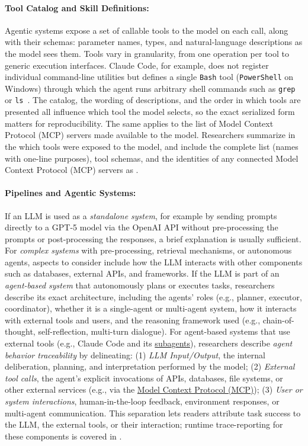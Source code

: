 \paragraph{Tool Catalog and Skill Definitions:}
Agentic systems expose a set of callable tools to the model on each call, along with their schemas: parameter names, types, and natural-language descriptions as the model sees them.
Tools vary in granularity, from one operation per tool to generic execution interfaces.
Claude Code, for example, does not register individual command-line utilities but defines a single \texttt{Bash} tool (\texttt{PowerShell} on Windows) through which the agent runs arbitrary shell commands such as \texttt{grep} or \texttt{ls}~\cite{anthropic_tools_reference}.
The catalog, the wording of descriptions, and the order in which tools are presented all influence which tool the model selects, so the exact serialized form matters for reproducibility.
The same applies to the list of Model Context Protocol (MCP) servers made available to the model.
Researchers \must summarize in the \paper which tools were exposed to the model, and \should include the complete list (names with one-line purposes), tool schemas, and the identities of any connected Model Context Protocol (MCP) servers as \supplementarymaterial. 

\paragraph{Pipelines and Agentic Systems:}
If an LLM is used as a \emph{standalone system}, for example by sending prompts directly to a GPT-5 model via the OpenAI API without pre-processing the prompts or post-processing the responses, a brief explanation is usually sufficient.
For \emph{complex systems} with pre-processing, retrieval mechanisms, or autonomous agents, aspects to consider include how the LLM interacts with other components such as databases, external APIs, and frameworks.
If the LLM is part of an \emph{agent-based system} that autonomously plans or executes tasks, researchers \must describe its exact architecture, including the agents' roles (e.g., planner, executor, coordinator), whether it is a single-agent or multi-agent system, how it interacts with external tools and users, and the reasoning framework used (e.g., chain-of-thought, self-reflection, multi-turn dialogue).
For agent-based systems that use external tools (e.g., Claude Code and its \href{https://docs.anthropic.com/en/docs/claude-code/sub-agents}{subagents}), researchers \must describe \emph{agent behavior traceability} by delineating: (1) \emph{LLM Input/Output}, the internal deliberation, planning, and interpretation performed by the model; (2) \emph{External tool calls}, the agent's explicit invocations of APIs, databases, file systems, or other external services (e.g., via the \href{https://modelcontextprotocol.io/}{Model Context Protocol (MCP)}); (3) \emph{User or system interactions}, human-in-the-loop feedback, environment responses, or multi-agent communication.
This separation lets readers attribute task success to the LLM, the external tools, or their interaction; runtime trace-reporting for these components is covered in \traces.

